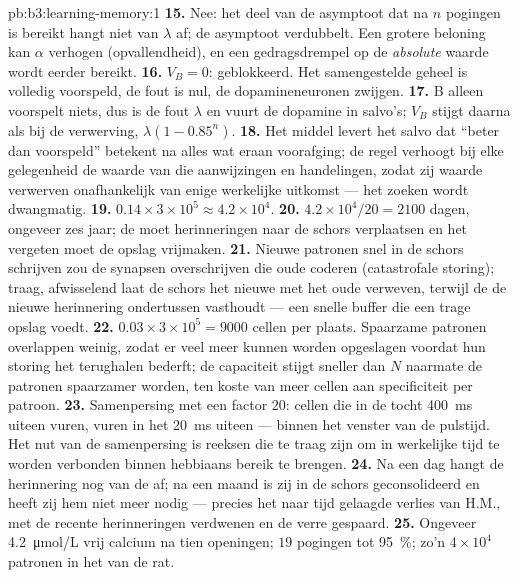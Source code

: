 \begin{solution}{pb:b3:learning-memory:1}
\textbf{15.} Nee: het deel van de asymptoot dat na $n$ pogingen is
bereikt hangt niet van $\lambda$ af; de asymptoot verdubbelt. Een
grotere beloning kan $\alpha$ verhogen (opvallendheid), en een
gedragsdrempel op de \emph{absolute} waarde wordt eerder bereikt.
\textbf{16.} $V_{B} = 0$: geblokkeerd. Het samengestelde geheel is
volledig voorspeld, de fout is nul, de dopamineneuronen zwijgen.
\textbf{17.} B alleen voorspelt niets, dus is de fout $\lambda$ en vuurt
de dopamine in salvo's; $V_{B}$ stijgt daarna als bij de verwerving,
$\lambda(1 -
0.85^{n})$.
\textbf{18.} Het middel levert het salvo dat ``beter dan voorspeld''
betekent na alles wat eraan voorafging; de regel verhoogt bij elke
gelegenheid de waarde van die aanwijzingen en handelingen, zodat zij
waarde verwerven onafhankelijk van enige werkelijke uitkomst --- het
zoeken wordt dwangmatig.
\textbf{19.} $0.14\times 3\times 10^{5} \approx 4.2\times 10^{4}$.
\textbf{20.} $4.2\times 10^{4}/20 = 2100$ dagen, ongeveer zes jaar; de
 moet herinneringen naar de schors verplaatsen en het
vergeten moet de opslag vrijmaken.
\textbf{21.} Nieuwe patronen snel in de schors schrijven zou de synapsen
overschrijven die oude coderen (catastrofale storing); traag,
afwisselend  laat de schors het nieuwe met het oude
verweven, terwijl de  de nieuwe herinnering ondertussen
vasthoudt --- een snelle buffer die een trage opslag voedt.
\textbf{22.} $0.03\times 3\times 10^{5} = 9000$ cellen per plaats.
Spaarzame patronen overlappen weinig, zodat er veel meer kunnen worden
opgeslagen voordat hun storing het terughalen bederft; de capaciteit
stijgt sneller dan $N$ naarmate de patronen spaarzamer worden, ten
koste van meer cellen aan specificiteit per patroon.
\textbf{23.} Samenpersing met een factor $20$: cellen die in de tocht
\qty{400}{ms} uiteen vuren, vuren in het  \qty{20}{ms}
uiteen --- binnen het venster van de pulstijd. Het nut van de
samenpersing is reeksen die te traag zijn om in werkelijke tijd te
worden verbonden binnen hebbiaans bereik te brengen.
\textbf{24.} Na een dag hangt de herinnering nog van de  af;
na een maand is zij in de schors geconsolideerd en heeft zij hem niet
meer nodig --- precies het naar tijd gelaagde verlies van H.M., met de
recente herinneringen verdwenen en de verre gespaard.
\textbf{25.} Ongeveer \qty{4.2}{\micro mol/L} vrij calcium na tien
openingen; $19$ pogingen tot \qty{95}{\%}; zo'n $4\times 10^{4}$
patronen in het  van de rat.
\end{solution}

